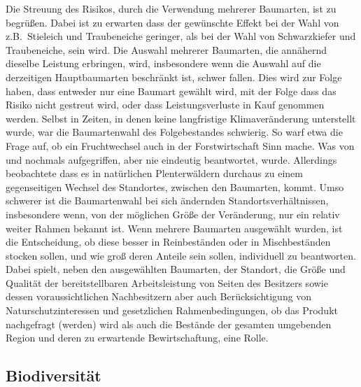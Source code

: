 \documentclass[twocolumn]{scrartcl}
\begin{document}
Die Streuung des Risikos, durch die Verwendung mehrerer Baumarten, ist
zu begrüßen. Dabei ist zu erwarten dass der gewünschte Effekt bei der
Wahl von z.B.\ Stieleich und Traubeneiche geringer, als bei der Wahl
von Schwarzkiefer und Traubeneiche, sein wird. Die Auswahl mehrerer
Baumarten, die annähernd dieselbe Leistung erbringen, wird,
insbesondere wenn die Auswahl auf die derzeitigen Hauptbaumarten
beschränkt ist, schwer fallen. Dies wird zur Folge haben, dass
entweder nur eine Baumart gewählt wird, mit der Folge dass das Risiko
nicht gestreut wird, oder dass Leistungsverluste in Kauf genommen
werden. Selbst in Zeiten, in denen keine langfristige Klimaveränderung
unterstellt wurde, war die Baumartenwahl des Folgebestandes
schwierig. So warf etwa \cite{jentsch1911fruchtwechsel} die Frage auf,
ob ein Fruchtwechsel auch in der Forstwirtschaft Sinn mache. Was von
\cite{sieber1919Holzartenwechsel} und
\cite{fabricius1924Holzartenwechsel} nochmals aufgegriffen, aber nie
eindeutig beantwortet, wurde. Allerdings beobachtete
\cite{simak1951Baumartenwechsel} dass es in natürlichen Plenterwäldern
durchaus zu einem gegenseitigen Wechsel des Standortes, zwischen den
Baumarten, kommt. Umso schwerer ist die Baumartenwahl bei sich
ändernden Standortsverhältnissen, insbesondere wenn, von der möglichen
Größe der Veränderung, nur ein relativ weiter Rahmen bekannt ist. Wenn
mehrere Baumarten ausgewählt wurden, ist die Entscheidung, ob diese
besser in Reinbeständen oder in Mischbeständen stocken sollen, und wie
groß deren Anteile sein sollen, individuell zu beantworten. Dabei
spielt, neben den ausgewählten Baumarten, der Standort, die Größe und
Qualität der bereitstellbaren Arbeitsleistung von Seiten des Besitzers
sowie dessen voraussichtlichen Nachbesitzern aber auch
Berücksichtigung von Naturschutzinteressen und gesetzlichen
Rahmenbedingungen, ob das Produkt nachgefragt (werden) wird als auch
die Bestände der gesamten umgebenden Region und deren zu erwartende
Bewirtschaftung, eine Rolle.

\subsection{Biodiversität}
\label{ssec:biodiversitaet}
\end{document}
